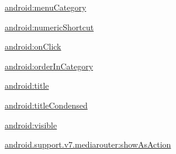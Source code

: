 {\ttfamily \hyperlink{classandroid_1_1support_1_1v7_1_1mediarouter_1_1R_1_1styleable_a16cb018cf379e9b666160eda49a4273f}{android\+:menu\+Category}}

{\ttfamily \hyperlink{classandroid_1_1support_1_1v7_1_1mediarouter_1_1R_1_1styleable_a04f5aceeca0d8b89d3a498c2886ca414}{android\+:numeric\+Shortcut}}

{\ttfamily \hyperlink{classandroid_1_1support_1_1v7_1_1mediarouter_1_1R_1_1styleable_a7e25b52cd1383264d67ed1d8c6a5f65b}{android\+:on\+Click}}

{\ttfamily \hyperlink{classandroid_1_1support_1_1v7_1_1mediarouter_1_1R_1_1styleable_acbad304663f7326b17ab0fa5039c800d}{android\+:order\+In\+Category}}

{\ttfamily \hyperlink{classandroid_1_1support_1_1v7_1_1mediarouter_1_1R_1_1styleable_a71817eb2dd1f553929554a4f7e1da381}{android\+:title}}

{\ttfamily \hyperlink{classandroid_1_1support_1_1v7_1_1mediarouter_1_1R_1_1styleable_a8dc58f0399700cf168f2710f0d92a4d1}{android\+:title\+Condensed}}

{\ttfamily \hyperlink{classandroid_1_1support_1_1v7_1_1mediarouter_1_1R_1_1styleable_a98a3c8d572abe706878f74a89c247b11}{android\+:visible}}

{\ttfamily \hyperlink{classandroid_1_1support_1_1v7_1_1mediarouter_1_1R_1_1styleable_ab4d2223f247d789c35977fff5fedfcca}{android.\+support.\+v7.\+mediarouter\+:show\+As\+Action}}

